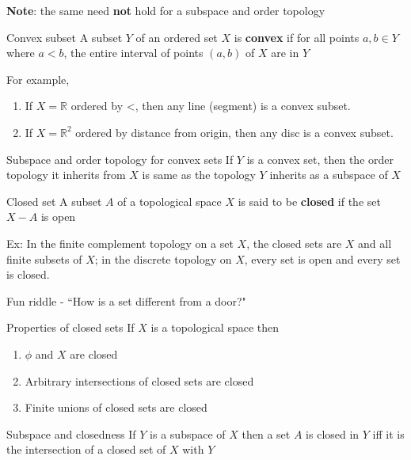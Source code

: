 \documentclass[titlepage, 12pt]{book}
\begin{document}
\textbf{Note}: the same need \textbf{not} hold for a subspace and order topology

\begin{definition}{Convex subset}{}
    A subset $Y$ of an ordered set $X$ is \textbf{convex} if for all points $a,
    b\in Y$ where $a < b$, the entire interval of points $(a, b)$ of $X$ are in
    $Y$
\end{definition}

For example,
\begin{enumerate}
    \item If $X = \mathbb{R}$ ordered by <, then any line (segment) is a convex subset.
    \item If $X = \mathbb{R}^2$ ordered by distance from origin, then any disc
        is a convex subset.
\end{enumerate}

\begin{theorem}{Subspace and order topology for convex sets}{}
    If $Y$ is a convex set, then the order topology it inherits from $X$ is same
    as the topology $Y$ inherits as a subspace of $X$
\end{theorem}
 
\begin{definition}{Closed set}{}
    A subset $A$ of a topological space $X$ is said to be \textbf{closed} if the
    set $X - A$ is open
\end{definition}
 
Ex: In the finite complement topology on a set $X$, the closed sets are $X$ and
all finite subsets of $X$; in the discrete topology on $X$, every set is open
and every set is closed.
 
Fun riddle - ``How is a set different from a door?"

\begin{theorem}{Properties of closed sets}{}
    If $X$ is a topological space then
    \begin{enumerate}
        \item $\phi$ and $X$ are closed
        \item Arbitrary intersections of closed sets are closed
        \item Finite unions of closed sets are closed
    \end{enumerate}
\end{theorem}

\begin{theorem}{Subspace and closedness}{}
    If $Y$ is a subspace of $X$ then a set $A$ is closed in $Y$ iff it is the
    intersection of a closed set of $X$ with $Y$
\end{theorem}
\end{document}

